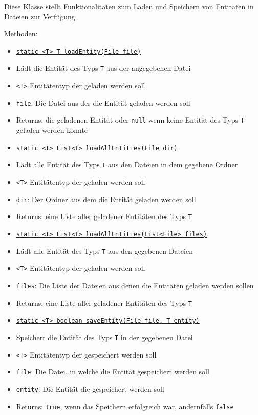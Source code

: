 \documentclass[parskip=full,11pt]{scrartcl}
\begin{document}
Diese Klasse stellt Funktionalitäten zum Laden und Speichern von Entitäten in Dateien zur Verfügung.

Methoden:

\begin{itemize}\itemsep -10pt
	\item \underline{\texttt{static <T> T loadEntity(File file)}}
	\item[] Lädt die Entität des Typs \texttt{T} aus der angegebenen Datei 
	\item[] \texttt{<T>} Entitätentyp der geladen werden soll
	\item[] \texttt{file}: Die Datei aus der die Entität geladen werden soll
	\item[]Returns: die geladenen Entität oder \texttt{null} wenn keine Entität des Typs \texttt{T} geladen werden konnte
	
	\item \underline{\texttt{static <T> List<T> loadAllEntities(File dir)}}
	\item[] Lädt alle Entität des Typs \texttt{T} aus den Dateien in dem gegebene Ordner 
	\item[] \texttt{<T>} Entitätentyp der geladen werden soll
	\item[] \texttt{dir}: Der Ordner aus dem die Entität geladen werden soll
	\item[]Returns: eine Liste aller geladener Entitäten des Typs \texttt{T}
	
	\item \underline{\texttt{static <T> List<T> loadAllEntities(List<File> files)}}
	\item[] Lädt alle Entität des Typs \texttt{T} aus den gegebenen Dateien
	\item[] \texttt{<T>} Entitätentyp der geladen werden soll
	\item[] \texttt{files}: Die Liste der Dateien aus denen die Entitäten geladen werden sollen
	\item[]Returns: eine Liste aller geladener Entitäten des Typs \texttt{T}

	\item \underline{\texttt{static <T> boolean saveEntity(File file, T entity)}}
\item[] Speichert die Entität des Typs \texttt{T} in der gegebenen Datei
\item[] \texttt{<T>} Entitätentyp der gespeichert werden soll
\item[] \texttt{file}: Die Datei, in welche die Entität gespeichert werden soll
\item[] \texttt{entity}: Die Entität die gespeichert werden soll
\item[]Returns: \texttt{true}, wenn das Speichern erfolgreich war, andernfalls \texttt{false}
\end{itemize}
\end{document}

